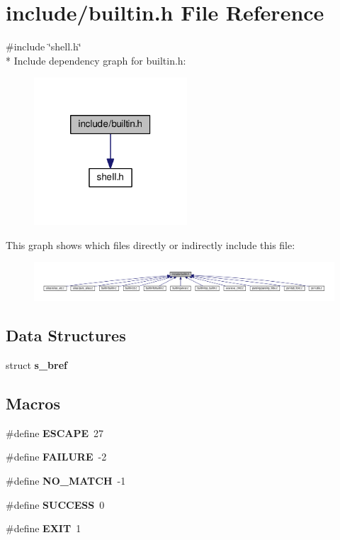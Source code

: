 \section{include/builtin.h File Reference}
\label{builtin_8h}
{\ttfamily \#include \char`\"{}shell.\-h\char`\"{}}\\*
Include dependency graph for builtin.\-h\-:\nopagebreak
\begin{figure}[H]
\begin{center}
\leavevmode
\includegraphics[width=162pt]{builtin_8h__incl}
\end{center}
\end{figure}
This graph shows which files directly or indirectly include this file\-:
\nopagebreak
\begin{figure}[H]
\begin{center}
\leavevmode
\includegraphics[width=350pt]{builtin_8h__dep__incl}
\end{center}
\end{figure}
\subsection*{Data Structures}
\begin{DoxyCompactItemize}
\item 
struct {\bf s\-\_\-bref}
\end{DoxyCompactItemize}
\subsection*{Macros}
\begin{DoxyCompactItemize}
\item 
\#define {\bf E\-S\-C\-A\-P\-E}~27
\item 
\#define {\bf F\-A\-I\-L\-U\-R\-E}~-\/2
\item 
\#define {\bf N\-O\-\_\-\-M\-A\-T\-C\-H}~-\/1
\item 
\#define {\bf S\-U\-C\-C\-E\-S\-S}~0
\item 
\#define {\bf E\-X\-I\-T}~1
\end{DoxyCompactItemize}
